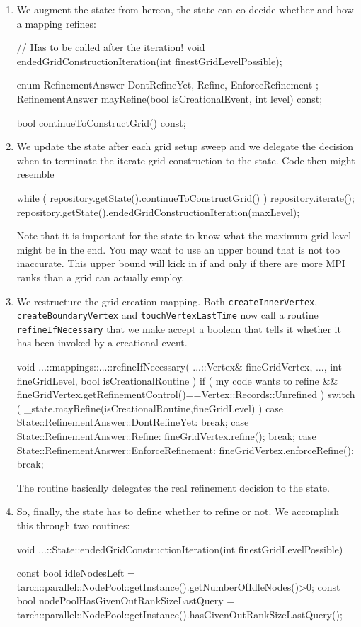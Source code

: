 \begin{enumerate}
  \item We augment the state: from hereon, the state can co-decide whether and
    how a mapping refines:
    \begin{code}
    // Has to be called after the iteration!
    void endedGridConstructionIteration(int finestGridLevelPossible);

    enum RefinementAnswer {
      DontRefineYet,
      Refine,
      EnforceRefinement
    };
    RefinementAnswer mayRefine(bool isCreationalEvent, int level) const;

    bool continueToConstructGrid() const;
    \end{code}


  \item We update the state after each grid setup sweep and we delegate the
  decision when to terminate the iterate grid construction to the state.
  Code then might resemble
    \begin{code}
  while ( repository.getState().continueToConstructGrid() ) {
    repository.iterate();
    repository.getState().endedGridConstructionIteration(maxLevel);
  }
    \end{code}
    Note that it is important for the state to know what the maximum grid level
    might be in the end. You may want to use an upper bound that is not too
    inaccurate. This upper bound will kick in if and only if there are more MPI
    ranks than a grid can actually employ.

  \item We restructure the grid creation mapping. Both
    \texttt{createInnerVertex}, \texttt{createBoundaryVertex} and
    \texttt{touchVertexLastTime} now call a routine \texttt{refineIfNecessary}
    that we make accept a boolean that tells it whether it has been invoked by a
    creational event.
    \begin{code}
void ...::mappings::...::refineIfNecessary(
  ...::Vertex&  fineGridVertex,
  ...,
  int           fineGridLevel,
  bool          isCreationalRoutine
) {
  if (
    my code wants to refine
    &&
    fineGridVertex.getRefinementControl()==Vertex::Records::Unrefined
  ) {
    switch ( _state.mayRefine(isCreationalRoutine,fineGridLevel) ) {
      case State::RefinementAnswer::DontRefineYet:
        break;
      case State::RefinementAnswer::Refine:
        fineGridVertex.refine();
        break;
      case State::RefinementAnswer::EnforceRefinement:
        fineGridVertex.enforceRefine();
        break;
    }
  }
}
    \end{code} 
    The routine basically delegates the real refinement decision to the state. 
  \item So, finally, the state has to define whether to refine or not. We
  accomplish this through two routines:
  \begin{code}
void ...::State::endedGridConstructionIteration(int finestGridLevelPossible) {
  const bool idleNodesLeft = 
    tarch::parallel::NodePool::getInstance().getNumberOfIdleNodes()>0;
  const bool nodePoolHasGivenOutRankSizeLastQuery = 
    tarch::parallel::NodePool::getInstance().hasGivenOutRankSizeLastQuery();

}
\end{code}
\end{enumerate}
